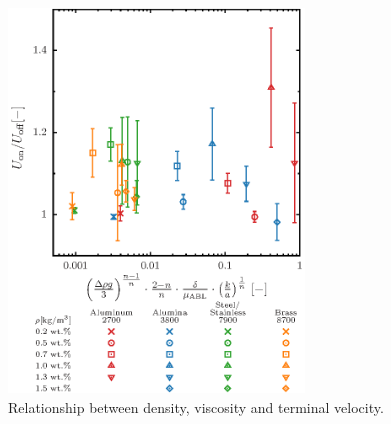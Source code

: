 \begin{figure}[ht]
    \centering
    \includegraphics[width=0.7\textwidth]{./5-Results/concentrationUdiffAll.eps}
    \caption{Relationship between density, viscosity and terminal velocity.}
    \label{fig:concentrationUdiffAll}
\end{figure}